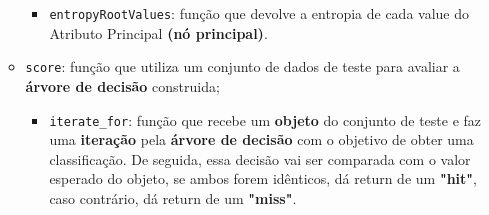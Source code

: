 \documentclass[11pt]{article}   %
\begin{document}
\begin{itemize}
\begin{itemize}
\begin{itemize}
            \item \verb|entropyRootValues|: função que devolve a entropia de cada value do Atributo Principal \textbf{(nó principal)}.
        \end{itemize}
        \item \verb|score|: função que utiliza um conjunto de dados de teste para avaliar a \textbf{árvore de decisão} construida;
        \begin{itemize}
            \item \verb|iterate_for|: função que recebe um \textbf{objeto} do conjunto de teste e faz uma \textbf{iteração} pela \textbf{árvore de decisão} com o objetivo de obter 
            uma classificação. De seguida, essa decisão vai ser comparada com o valor esperado do objeto, se ambos forem idênticos, dá return de um \textbf{"hit"},
            caso contrário, dá return de um \textbf{"miss"}.
        \end{itemize}
    \end{itemize}
\end{itemize}
\end{document}
